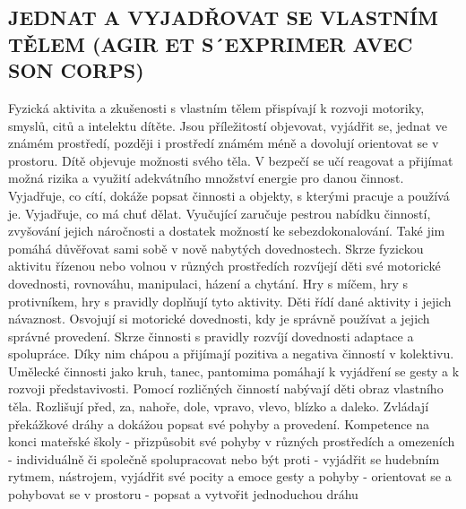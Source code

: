 	\subsection{JEDNAT A VYJADŘOVAT SE VLASTNÍM TĚLEM (AGIR ET S´EXPRIMER AVEC SON CORPS)}
		Fyzická aktivita a zkušenosti s vlastním tělem přispívají k rozvoji motoriky, smyslů, citů a intelektu dítěte. Jsou příležitostí objevovat, vyjádřit se, jednat ve známém prostředí, později i prostředí známém méně a dovolují orientovat se v prostoru. Dítě objevuje možnosti svého těla.  V bezpečí se učí reagovat a přijímat možná rizika a využití adekvátního množství energie pro danou činnost. Vyjadřuje, co cítí, dokáže popsat činnosti a objekty, s kterými pracuje a používá je. Vyjadřuje, co má chuť dělat. Vyučující zaručuje  pestrou nabídku činností, zvyšování jejich náročnosti a dostatek možností ke sebezdokonalování. Také jim pomáhá důvěřovat sami sobě v nově nabytých dovednostech. 
		Skrze fyzickou aktivitu řízenou nebo volnou v různých prostředích rozvíjejí děti své motorické dovednosti, rovnováhu, manipulaci, házení a chytání. Hry s míčem, hry s protivníkem, hry s pravidly doplňují tyto aktivity. Děti řídí dané aktivity i jejich návaznost. Osvojují si motorické dovednosti, kdy je správně používat a jejich správné provedení. 
		Skrze činnosti s pravidly rozvíjí dovednosti adaptace a spolupráce. Díky nim chápou a přijímají pozitiva a negativa činností v kolektivu. 
		Umělecké činnosti jako kruh, tanec, pantomima pomáhají k vyjádření se gesty a k rozvoji představivosti.
		Pomocí rozličných činností nabývají děti obraz vlastního těla. Rozlišují před, za, nahoře, dole, vpravo, vlevo, blízko a daleko. Zvládají překážkové dráhy a dokážou popsat své pohyby a provedení.
		Kompetence na konci mateřské školy
		- přizpůsobit své pohyby v různých prostředích a omezeních
		- individuálně či společně spolupracovat nebo být proti
		- vyjádřit se hudebním rytmem, nástrojem, vyjádřit své pocity a emoce gesty a pohyby
		- orientovat se a pohybovat se v prostoru
		- popsat a vytvořit jednoduchou dráhu

